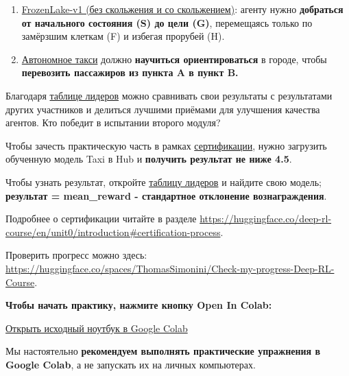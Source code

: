 \documentclass[11pt,a4paper]{article}
\begin{document}
\begin{enumerate}
\def\labelenumi{\arabic{enumi}.}
\tightlist
\item
  \href{https://gymnasium.farama.org/environments/toy_text/frozen_lake/}{FrozenLake-v1 (без скольжения и со скольжением)}: агенту нужно \textbf{добраться от начального состояния (S) до цели (G)}, перемещаясь только по замёрзшим клеткам (F) и избегая прорубей (H).
\item
  \href{https://gymnasium.farama.org/environments/toy_text/taxi/}{Автономное такси} должно \textbf{научиться ориентироваться} в городе, чтобы \textbf{перевозить пассажиров из пункта A в пункт B.}
\end{enumerate}


Благодаря \href{https://huggingface.co/spaces/huggingface-projects/Deep-Reinforcement-Learning-Leaderboard}{таблице лидеров} можно сравнивать свои результаты с результатами других участников и делиться лучшими приёмами для улучшения качества агентов. Кто победит в испытании второго модуля?

Чтобы зачесть практическую часть в рамках \href{https://huggingface.co/deep-rl-course/en/unit0/introduction\#certification-process}{сертификации}, нужно загрузить обученную модель Taxi в Hub и \textbf{получить результат не ниже 4.5}.

Чтобы узнать результат, откройте \href{https://huggingface.co/spaces/huggingface-projects/Deep-Reinforcement-Learning-Leaderboard}{таблицу лидеров} и найдите свою модель; \textbf{результат = mean\_reward - стандартное отклонение вознаграждения}.

Подробнее о сертификации читайте в разделе \url{https://huggingface.co/deep-rl-course/en/unit0/introduction\#certification-process}.

Проверить прогресс можно здесь: \url{https://huggingface.co/spaces/ThomasSimonini/Check-my-progress-Deep-RL-Course}.

\textbf{Чтобы начать практику, нажмите кнопку Open In Colab:}

\href{https://colab.research.google.com/github/huggingface/deep-rl-class/blob/master/notebooks/unit2/unit2.ipynb}{Открыть исходный ноутбук в Google Colab}

Мы настоятельно \textbf{рекомендуем выполнять практические упражнения в Google Colab}, а не запускать их на личных компьютерах.
\end{document}
